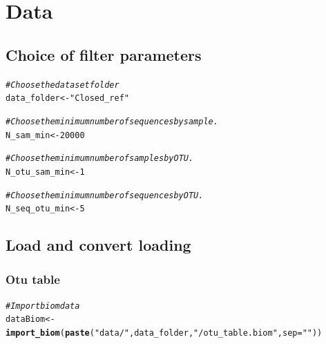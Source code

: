 \documentclass[12pt]{article}\usepackage[]{graphicx}\usepackage[]{color}
\makeatletter
\newcommand{\hlnum}[1]{\textcolor[rgb]{0.686,0.059,0.569}{#1}}%
\newcommand{\hlstr}[1]{\textcolor[rgb]{0.192,0.494,0.8}{#1}}%
\newcommand{\hlcom}[1]{\textcolor[rgb]{0.678,0.584,0.686}{\textit{#1}}}%
\newcommand{\hlstd}[1]{\textcolor[rgb]{0.345,0.345,0.345}{#1}}%
\newcommand{\hlkwb}[1]{\textcolor[rgb]{0.69,0.353,0.396}{#1}}%
\newcommand{\hlkwc}[1]{\textcolor[rgb]{0.333,0.667,0.333}{#1}}%
\newcommand{\hlkwd}[1]{\textcolor[rgb]{0.737,0.353,0.396}{\textbf{#1}}}%
\newenvironment{kframe}{%
 \def\at@end@of@kframe{}%
 \ifinner\ifhmode%
  \def\at@end@of@kframe{\end{minipage}}%
  \begin{minipage}{\columnwidth}%
 \fi\fi%
 \def\FrameCommand##1{\hskip\@totalleftmargin \hskip-\fboxsep
 \colorbox{shadecolor}{##1}\hskip-\fboxsep
     \hskip-\linewidth \hskip-\@totalleftmargin \hskip\columnwidth}%
 \MakeFramed {\advance\hsize-\width
   \@totalleftmargin\z@ \linewidth\hsize
   \@setminipage}}%
 {\par\unskip\endMakeFramed%
 \at@end@of@kframe}
\newenvironment{knitrout}{}{} %
\numberwithin{figure}{section}
\makeatother
\begin{document}
\section{Data}

  \subsection{Choice of filter parameters}
  \label{section:filter}
\begin{knitrout}\small
{}\color{fgcolor}\begin{kframe}
\begin{alltt}
\hlcom{#Choose the dataset folder}
\hlstd{data_folder} \hlkwb{<-} \hlstr{"Closed_ref"}

\hlcom{#Choose the minimum number of sequences by sample.}
\hlstd{N_sam_min} \hlkwb{<-} \hlnum{20000}

\hlcom{#Choose the minimum number of samples by OTU.}
\hlstd{N_otu_sam_min} \hlkwb{<-} \hlnum{1}

\hlcom{#Choose the minimum number of sequences by OTU.}
\hlstd{N_seq_otu_min} \hlkwb{<-} \hlnum{5}
\end{alltt}
\end{kframe}
\end{knitrout}


  \subsection{Load and convert loading}
  \subsubsection{Otu table}
\begin{knitrout}\small
{}\color{fgcolor}\begin{kframe}
\begin{alltt}
\hlcom{#Import biom data}
\hlstd{dataBiom}   \hlkwb{<-} \hlkwd{import_biom}\hlstd{(}\hlkwd{paste}\hlstd{(}\hlstr{"data/"}\hlstd{, data_folder,} \hlstr{"/otu_table.biom"}\hlstd{,} \hlkwc{sep}\hlstd{=}\hlstr{""}\hlstd{))}
\end{alltt}
\end{kframe}
\end{knitrout}
\end{document}

